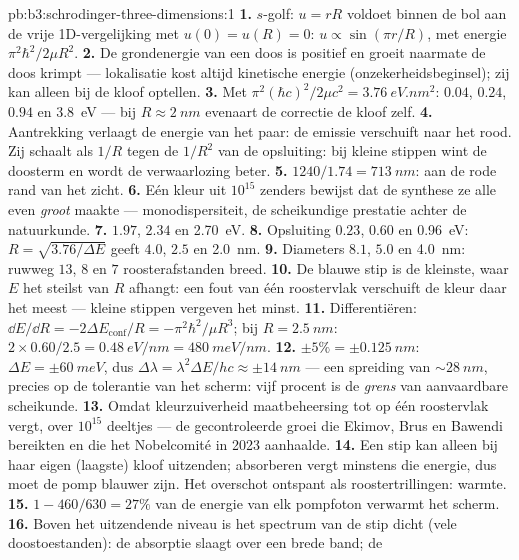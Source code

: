 \begin{solution}{pb:b3:schrodinger-three-dimensions:1}
\textbf{1.} $s$-golf: $u = rR$ voldoet binnen de bol aan de vrije
1D-vergelijking met $u(0) = u(R) = 0$: $u \propto \sin(\pi r/R)$, met
energie $\pi^2\hbar^2/2\mu R^2$.
\textbf{2.} De grondenergie van een doos is positief en groeit naarmate
de doos krimpt --- lokalisatie kost altijd kinetische energie
(onzekerheidsbeginsel); zij kan alleen bij de kloof optellen.
\textbf{3.} Met $\pi^2(\hbar c)^2/2\mu c^2 = \qty{3.76}{eV.nm^2}$:
$0.04$, $0.24$, $0.94$ en \qty{3.8}{eV} --- bij $R \approx \qty{2}{nm}$
evenaart de correctie de kloof zelf.
\textbf{4.} Aantrekking verlaagt de energie van het paar: de emissie
verschuift naar het rood. Zij schaalt als $1/R$ tegen de $1/R^2$ van de
opsluiting: bij kleine stippen wint de doosterm en wordt de
verwaarlozing beter.
\textbf{5.} $1240/1.74 = \qty{713}{nm}$: aan de rode rand van het zicht.
\textbf{6.} Eén kleur uit $10^{15}$ zenders bewijst dat de synthese ze
alle even \emph{groot} maakte --- monodispersiteit, de scheikundige
prestatie achter de natuurkunde.
\textbf{7.} $1.97$, $2.34$ en \qty{2.70}{eV}.
\textbf{8.} Opsluiting $0.23$, $0.60$ en \qty{0.96}{eV}: $R =
\sqrt{3.76/\Delta E}$ geeft $4.0$, $2.5$ en \qty{2.0}{nm}.
\textbf{9.} Diameters $8.1$, $5.0$ en \qty{4.0}{nm}: ruwweg $13$, $8$ en
$7$ roosterafstanden breed.
\textbf{10.} De blauwe stip is de kleinste, waar $E$ het steilst van $R$
afhangt: een fout van één roostervlak verschuift de kleur daar het meest
--- kleine stippen vergeven het minst.
\textbf{11.} Differentiëren: $\dd E/\dd R = -2\Delta E_{\text{conf}}/R
= -\pi^2\hbar^2/\mu R^3$; bij $R = \qty{2.5}{nm}$: $2 \times 0.60/2.5
= \qty{0.48}{eV/nm} = \qty{480}{meV/nm}$.
\textbf{12.} $\pm 5\% = \pm\qty{0.125}{nm}$: $\Delta E = \pm
\qty{60}{meV}$, dus $\Delta\lambda = \lambda^2\Delta E/hc \approx
\pm\qty{14}{nm}$ --- een spreiding van $\sim\qty{28}{nm}$, precies op de
tolerantie van het scherm: vijf procent is de \emph{grens} van
aanvaardbare scheikunde.
\textbf{13.} Omdat kleurzuiverheid maatbeheersing tot op één roostervlak
vergt, over $10^{15}$ deeltjes --- de gecontroleerde groei die Ekimov,
Brus en Bawendi bereikten en die het Nobelcomité in 2023 aanhaalde.
\textbf{14.} Een stip kan alleen bij haar eigen (laagste) kloof
uitzenden; absorberen vergt minstens die energie, dus moet de pomp
blauwer zijn. Het overschot ontspant als roostertrillingen: warmte.
\textbf{15.} $1 - 460/630 = 27\%$ van de energie van elk pompfoton
verwarmt het scherm.
\textbf{16.} Boven het uitzendende niveau is het spectrum van de stip
dicht (vele doostoestanden): de absorptie slaagt over een brede band; de

\end{solution}
